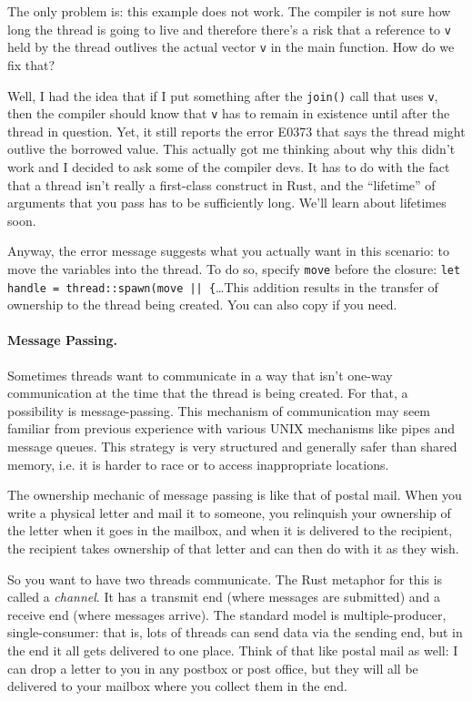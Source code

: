 The only problem is: this example does not work. The compiler is not sure how long the thread is going to live and therefore there's a risk that a reference to \texttt{v} held by the thread outlives the actual vector \texttt{v} in the main function. How do we fix that?

Well, I had the idea that if I put something after the \texttt{join()} call that uses \texttt{v}, then the compiler should know that \texttt{v} has to remain in existence until after the thread in question. Yet, it still reports the error E0373 that says the thread might outlive the borrowed value. This actually got me thinking about why this didn't work and I decided to ask some of the compiler devs. It has to do with the fact that a thread isn't really a first-class construct in Rust, and the ``lifetime'' of arguments that you pass has to be sufficiently long. We'll learn about lifetimes soon.

Anyway, the error message suggests what you actually want in this scenario: to move the variables into the thread. To do so, specify \texttt{move} before the closure: \texttt{let handle = thread::spawn(move || \{}\ldots This addition results in the transfer of ownership to the thread being created. You can also copy if you need.

\paragraph{Message Passing.} Sometimes threads want to communicate in a way that isn't one-way communication at the time that the thread is being created. For that, a possibility is message-passing. This mechanism of communication may seem familiar from previous experience with various UNIX mechanisms like pipes and message queues. This strategy is very structured and generally safer than shared memory, i.e. it is harder to race or to access inappropriate locations.

The ownership mechanic of message passing is like that of postal mail. When you write a physical letter and mail it to someone, you relinquish your ownership of the letter when it goes in the mailbox, and when it is delivered to the recipient, the recipient takes ownership of that letter and can then do with it as they wish.

So you want to have two threads communicate. The Rust metaphor for this is called a \textit{channel}. It has a transmit end (where messages are submitted) and a receive end (where messages arrive). The standard model is multiple-producer, single-consumer: that is, lots of threads can send data via the sending end, but in the end it all gets delivered to one place. Think of that like postal mail as well: I can drop a letter to you in any postbox or post office, but they will all be delivered to your mailbox where you collect them in the end.

